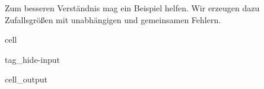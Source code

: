\documentclass[letterpaper,10pt,english]{jupyterBook}
\begin{document}
\sphinxAtStartPar
Zum besseren Verständnis mag ein Beispiel helfen. Wir erzeugen dazu Zufallsgrößen mit
unabhängigen und gemeinsamen Fehlern.

\begin{sphinxuseclass}{cell}
\begin{sphinxuseclass}{tag_hide-input}\begin{sphinxVerbatimOutput}

\begin{sphinxuseclass}{cell_output}
\noindent{}

\end{sphinxuseclass}\end{sphinxVerbatimOutput}

\end{sphinxuseclass}
\end{sphinxuseclass}
\end{document}

